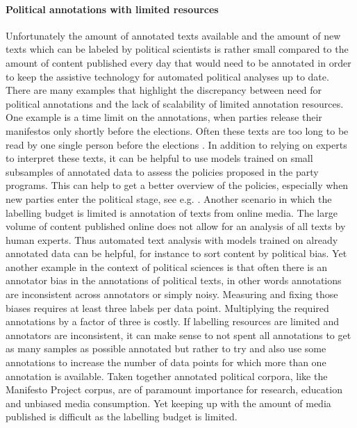 \documentclass[runningheads,a4paper]{article}
\begin{document}
\paragraph{Political annotations with limited resources}
Unfortunately the amount of annotated texts available and the amount of new texts which can be labeled by political scientists is rather small compared to the amount of content published every day that would need to be annotated in order to keep the assistive technology for automated political analyses up to date. 
There are many examples that highlight the discrepancy between need for political annotations and the lack of scalability of limited annotation resources. One example is a time limit on the annotations, when parties release their manifestos only shortly before the elections. Often these texts are too long to be read by one single person before the elections \cite{merz2017}. In addition to relying on experts to interpret these texts, it can be helpful to use models trained on small subsamples of annotated data to assess the policies proposed in the party programs. This can help to get a better overview of the policies, especially when new parties enter the political stage, see e.g. \cite{bronline}. 
Another scenario in which the labelling budget is limited is annotation of texts from online media. The large volume of content published online does not allow for an analysis of all texts by human experts. Thus automated text analysis with models trained on already annotated data can be helpful, for instance to sort content by political bias. 
Yet another example in the context of political sciences is that often there is an annotator bias in the annotations of political texts, in other words annotations are inconsistent across annotators or simply noisy. Measuring and fixing those biases requires at least three labels per data point. Multiplying the required annotations by a factor of three is costly. If labelling resources are limited and annotators are inconsistent, it can make sense to not spent all annotations to get as many samples as possible annotated but rather to try and also use some annotations to increase the number of data points for which more than one annotation is available. %
Taken together annotated political corpora, like the Manifesto Project corpus, are of paramount importance for research, education and unbiased media consumption. Yet keeping up with the amount of media published is difficult as the labelling budget is limited.  
\end{document}
